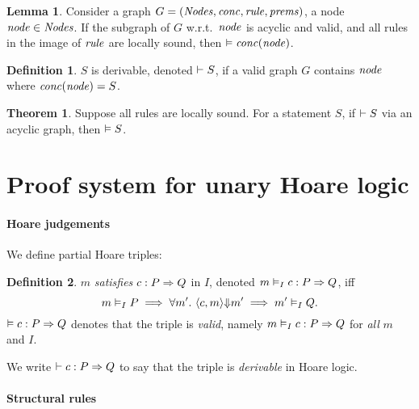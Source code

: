 \documentclass[10pt]{article}
\theoremstyle{definition}
\newtheorem{definition}{Definition}
\newtheorem{theorem}{Theorem}
\newtheorem{lemma}{Lemma}
\begin{document}
\begin{lemma}
    Consider a graph $G=(\mathit{Nodes},\mathit{conc},\mathit{rule},\mathit{prems})$,
    a node $\mathit{node} \in \mathit{Nodes}$.
    If the subgraph of $G$ w.r.t.\ $\mathit{node}$ is acyclic and valid,
    and all rules in the image of $\mathit{rule}$ are locally sound,
    then $\vDash \mathit{conc}(\mathit{node})$.
\end{lemma}

\begin{definition}
    $S$ is derivable, denoted $\vdash S$,
    if a valid graph $G$ contains $\mathit{node}$
    where $\mathit{conc}(\mathit{node}) = S$.
\end{definition}

\begin{theorem}
    Suppose all rules are locally sound.
    For a statement $S$,
    if $\vdash S$ via an acyclic graph,
    then $\vDash S$.
\end{theorem}




\section{Proof system for unary Hoare logic}

\paragraph{Hoare judgements}
We define partial Hoare triples:
\begin{definition}
    $m$ \emph{satisfies}
    $\Triple c : P => Q$ in $I$,
    denoted $\AVALmi \Triple c : P => Q$,
    iff    
    $$\AVALmi P \implies \forall m'.\
    \Yields(c,m,m') \implies
    \AVAL m'|I|-Q.$$
%
$\AVALU \Triple c : P => Q$ denotes
that the triple is \emph{valid},
namely $\AVALmi \Triple c : P => Q$
for \emph{all} $m$ and $I$.
\end{definition}

We write $\DER \Triple c : P => Q$ to say that
the triple is \emph{derivable} in Hoare logic.

\iffalse
\begin{displaymath}
\begin{array}{lcl}
    \Triple c : P => Q
    & \triangleq &
    \forall m \in P, m'.\
    \Cfg(c,m) \sstepstotrans \Cfg(\Skip,m') \implies
    m' \in Q
\end{array}
\end{displaymath}
\fi


\paragraph{Structural rules}
\end{document}
